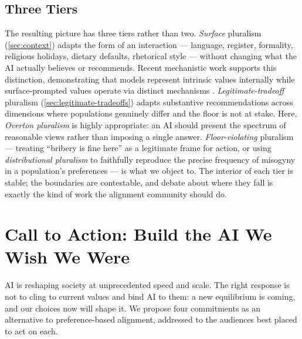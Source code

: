 \documentclass{article}
\theoremstyle{plain}
\theoremstyle{definition}
\theoremstyle{remark}
\begin{document}
\subsection{Three Tiers}
\label{sec:three-tiers}
The resulting picture has three tiers rather than two. \emph{Surface} pluralism (\cref{sec:context}) adapts the form of an interaction --- language, register, formality, religious holidays, dietary defaults, rhetorical style --- without changing what the AI actually believes or recommends. Recent mechanistic work supports this distinction, demonstrating that models represent intrinsic values internally while surface-prompted values operate via distinct mechanisms \citep{han2026dual}. \emph{Legitimate-tradeoff} pluralism (\cref{sec:legitimate-tradeoffs}) adapts substantive recommendations across dimensions where populations genuinely differ and the floor is not at stake. Here, \emph{Overton pluralism} \citep{sorensen2024roadmap} is highly appropriate: an AI should present the spectrum of reasonable views rather than imposing a single answer. \emph{Floor-violating} pluralism --- treating ``bribery is fine here'' as a legitimate frame for action, or using \emph{distributional pluralism} to faithfully reproduce the precise frequency of misogyny in a population's preferences --- is what we object to. The interior of each tier is stable; the boundaries are contestable, and debate about where they fall is exactly the kind of work the alignment community should do.

\section{Call to Action: Build the AI We Wish We Were}
\label{sec:cta}

AI is reshaping society at unprecedented speed and scale. The right response is not to cling to current values and bind AI to them: a new equilibrium is coming, and our choices now will shape it. We propose four commitments as an alternative to preference-based alignment, addressed to the audiences best placed to act on each.
\end{document}
